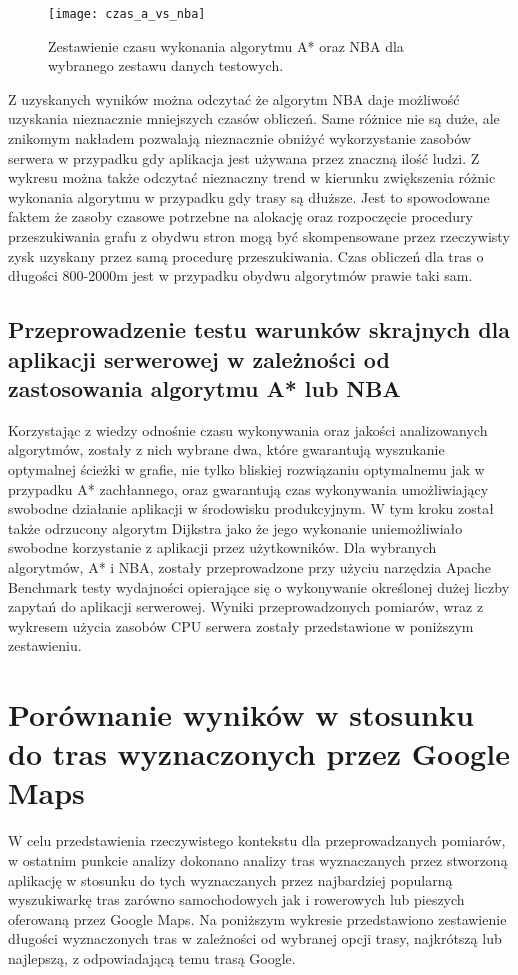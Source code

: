 \begin{figure}[H]
\centering
\texttt{[image: czas\_a\_vs\_nba]}
\caption{Zestawienie czasu wykonania algorytmu A* oraz NBA dla wybranego zestawu danych testowych.}
\end{figure}

Z uzyskanych wyników można odczytać że algorytm NBA daje możliwość uzyskania nieznacznie mniejszych czasów obliczeń. Same różnice nie są duże, ale znikomym nakładem pozwalają nieznacznie obniżyć wykorzystanie zasobów serwera w przypadku gdy aplikacja jest używana przez znaczną ilość ludzi. Z wykresu można także odczytać nieznaczny trend w kierunku zwiększenia różnic wykonania algorytmu w przypadku gdy trasy są dłuższe. Jest to spowodowane faktem że zasoby czasowe potrzebne na alokację oraz rozpoczęcie procedury przeszukiwania grafu z obydwu stron mogą być skompensowane przez rzeczywisty zysk uzyskany przez samą procedurę przeszukiwania. Czas obliczeń dla tras o długości 800-2000m jest w przypadku obydwu algorytmów prawie taki sam.

\subsection{Przeprowadzenie testu warunków skrajnych dla aplikacji serwerowej w zależności od zastosowania algorytmu A* lub NBA}

Korzystając z wiedzy odnośnie czasu wykonywania oraz jakości analizowanych algorytmów, zostały z nich wybrane dwa, które gwarantują wyszukanie optymalnej ścieżki w grafie, nie tylko bliskiej rozwiązaniu optymalnemu jak w przypadku A* zachłannego, oraz gwarantują czas wykonywania umożliwiający swobodne działanie aplikacji w środowisku produkcyjnym. W tym kroku został także odrzucony algorytm Dijkstra jako że jego wykonanie uniemożliwiało swobodne korzystanie z aplikacji przez użytkowników. Dla wybranych algorytmów, A* i NBA, zostały przeprowadzone przy użyciu narzędzia Apache Benchmark testy wydajności opierające się o wykonywanie określonej dużej liczby zapytań do aplikacji serwerowej. Wyniki przeprowadzonych pomiarów, wraz z wykresem użycia zasobów CPU serwera zostały przedstawione w poniższym zestawieniu.

\section{Porównanie wyników w stosunku do tras wyznaczonych przez Google Maps}

W celu przedstawienia rzeczywistego kontekstu dla przeprowadzanych pomiarów, w ostatnim punkcie analizy dokonano analizy tras wyznaczanych przez stworzoną aplikację w stosunku do tych wyznaczanych przez najbardziej popularną wyszukiwarkę tras zarówno samochodowych jak i rowerowych lub pieszych oferowaną przez Google Maps. Na poniższym wykresie przedstawiono zestawienie długości wyznaczonych tras w zależności od wybranej opcji trasy, najkrótszą lub najlepszą, z odpowiadającą temu trasą Google.

